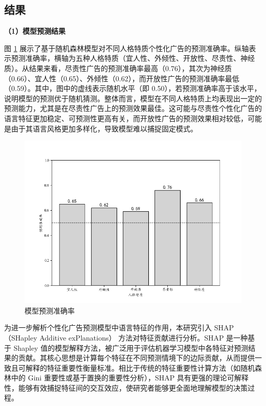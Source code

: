 \subsection{结果}

\textbf{（1）模型预测结果}

图 \ref{fig:prediction_accuracy} 展示了基于随机森林模型对不同人格特质个性化广告的预测准确率。纵轴表示预测准确率，横轴为五种人格特质（宜人性、外倾性、开放性、尽责性、神经质）。从结果来看，尽责性广告的预测准确率最高（0.76），其次为神经质（0.66）、宜人性（0.65）、外倾性（0.62），而开放性广告的预测准确率最低（0.59）。其中，图中的虚线表示随机水平（即 0.50），若预测准确率高于该水平，说明模型的预测优于随机猜测。整体而言，模型在不同人格特质上均表现出一定的预测能力，尤其是在尽责性广告上的预测效果最佳。这可能与尽责性个性化广告的语言特征更加稳定、可预测性更高有关，而开放性广告的预测效果相对较低，可能是由于其语言风格更加多样化，导致模型难以捕捉固定模式。

\begin{figure}[H]
    \centering
    \includegraphics[width=1\linewidth]{Image/Study3-predictionAccuray.png}
    \caption{\label{fig:prediction_accuracy}模型预测准确率}
\end{figure}

为进一步解析个性化广告预测模型中语言特征的作用，本研究引入 SHAP（SHapley Additive exPlanations） 方法对特征贡献进行分析。SHAP 是一种基于 Shapley 值的模型解释方法，被广泛用于评估机器学习模型中各特征对预测结果的贡献。其核心思想是计算每个特征在不同预测情境下的边际贡献，从而提供一致且可解释的特征重要性衡量标准。相比于传统的特征重要性计算方法（如随机森林中的 Gini 重要性或基于置换的重要性分析），SHAP 具有更强的理论可解释性，能够有效捕捉特征间的交互效应，使研究者能够更全面地理解模型的决策过程。

